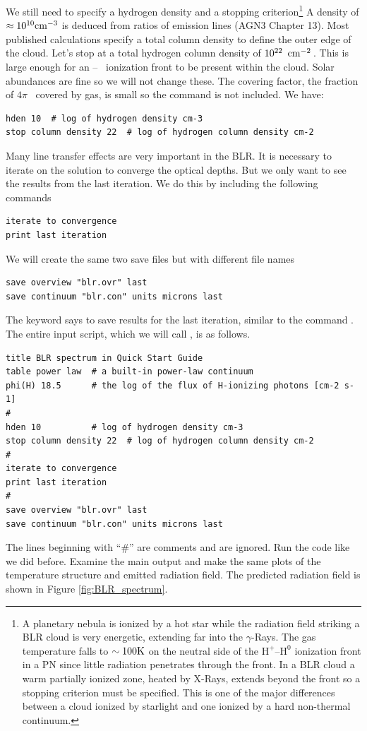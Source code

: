 \documentclass[12pt,twoside]{article}
\begin{document}
We still need to specify a hydrogen density and a stopping
criterion\footnote{A planetary nebula is ionized by a hot star while the radiation
field striking a BLR cloud is very energetic, extending far into the $\gamma$-Rays.
The gas temperature falls to $\sim 100 \rm{K}$
on the neutral side of the $\mathrm{H}^+$--$\mathrm{H}^0$
ionization front in a PN since little radiation penetrates through the front.
In a BLR cloud a warm partially ionized zone, heated by X-Rays, extends
beyond the front so a stopping criterion must be specified.  This is one
of the major differences between a cloud ionized by starlight and one ionized
by a hard non-thermal continuum.}
A density of $\approx 10^{10} \rm{cm^{-3}}$ is
deduced from ratios of emission lines (AGN3
Chapter 13).
Most published calculations specify a total column density
to define the outer edge of the cloud.
Let's stop at a total hydrogen column density
of $10^{22}\ \mbox{${\rm\thinspace cm}^{-2}\,$}$.
This is large enough for an \hplus -- \hO\
ionization front to be present within the cloud.
Solar abundances are fine so we will not change these.
The covering factor, the fraction of $4\pi$ \sr\ covered by gas, is
small so the \cdCommand{sphere} command is not included.  We have:
\small
\begin{verbatim}
hden 10  # log of hydrogen density cm-3
stop column density 22  # log of hydrogen column density cm-2
\end{verbatim}
\normalsize
Many line transfer effects are very important in the BLR.  It is necessary
to iterate on the solution to converge the optical depths.  
But we only want to see the results from the last iteration.
We do this by
including the following commands
\small
\begin{verbatim}
iterate to convergence
print last iteration
\end{verbatim}
\normalsize
We will create the same two save files but with different file names
\small
\begin{verbatim}
save overview "blr.ovr" last
save continuum "blr.con" units microns last
\end{verbatim}
\normalsize
The keyword  says to save results
for the last iteration, 
similar to the command .
The entire
input script, which we will call , is as follows.
\small
\begin{verbatim}
title BLR spectrum in Quick Start Guide
table power law  # a built-in power-law continuum
phi(H) 18.5      # the log of the flux of H-ionizing photons [cm-2 s-1]
#
hden 10          # log of hydrogen density cm-3
stop column density 22  # log of hydrogen column density cm-2
#
iterate to convergence
print last iteration
#
save overview "blr.ovr" last
save continuum "blr.con" units microns last
\end{verbatim}
\normalsize
The lines beginning with ``\#'' are comments and are ignored.
Run the code like we did before.
Examine the main output  and make
the same plots of the temperature structure and emitted radiation field.
The predicted radiation field is shown in Figure \ref{fig:BLR_spectrum}.
\end{document}
